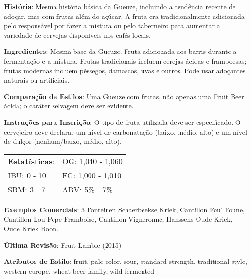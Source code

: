 \textbf{História}: Mesma história básica da Gueuze, incluindo a tendência recente de adoçar, mas com frutas além do açúcar. A fruta era tradicionalmente adicionada pelo responsável por fazer a mistura ou pelo taberneiro para aumentar a variedade de cervejas disponíveis nos cafés locais.

\textbf{Ingredientes}: Mesma base da Gueuze. Fruta adicionada aos barris durante a fermentação e a mistura. Frutas tradicionais incluem cerejas ácidas e framboesas; frutas modernas incluem pêssegos, damascos, uvas e outros. Pode usar adoçantes naturais ou artificiais.

\textbf{Comparação de Estilos}: Uma Gueuze com frutas, não apenas uma Fruit Beer ácida; o caráter selvagem deve ser evidente.

\textbf{Instruções para Inscrição}: O tipo de fruta utilizada deve ser especificado. O cervejeiro deve declarar um nível de carbonatação (baixo, médio, alto) e um nível de dulçor (nenhum/baixo, médio, alto).

\begin{tabular}{@{}p{35mm}p{35mm}@{}}
  \textbf{Estatísticas}: & OG: 1,040 - 1,060 \\
  IBU: 0 - 10  & FG: 1,000 - 1,010  \\
  SRM: 3 - 7  & ABV: 5\% - 7\%
\end{tabular}

\textbf{Exemplos Comerciais}: 3 Fonteinen Schaerbeekse Kriek, Cantillon Fou’ Foune, Cantillon Lou Pepe Framboise, Cantillon Vigneronne, Hanssens Oude Kriek, Oude Kriek Boon.

\textbf{Última Revisão}: Fruit Lambic (2015)

\textbf{Atributos de Estilo}: fruit, pale-color, sour, standard-strength, traditional-style, western-europe, wheat-beer-family, wild-fermented

